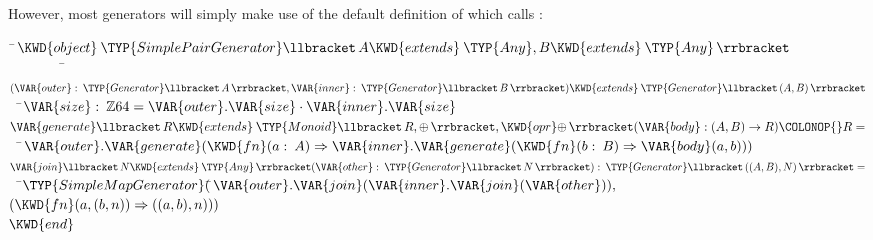However, most generators will simply make use of the default
definition of  which calls :
\begin{Fortress}
{\tt~}\pushtabs\=\+\( \KWD{object}\mskip 4mu plus 4mu\TYP{SimplePairGenerator}\llbracket\,A \KWD{extends}\mskip 4mu plus 4mu\TYP{Any}, B \KWD{extends}\mskip 4mu plus 4mu\TYP{Any}\,\rrbracket\)\\
{\tt~~~~~~~~}\pushtabs\=\+\(         (\VAR{outer} \mathrel{\mathtt{:}}\mskip 4mu plus 4mu\TYP{Generator}\llbracket\,A\,\rrbracket, \VAR{inner} \mathrel{\mathtt{:}}\mskip 4mu plus 4mu\TYP{Generator}\llbracket\,B\,\rrbracket) \KWD{extends}\mskip 4mu plus 4mu\TYP{Generator}\llbracket\,(A, B)\,\rrbracket\)\-\\\poptabs
{\tt~~}\pushtabs\=\+\(   \VAR{size} \mathrel{\mathtt{:}}\mskip 4mu plus 4mu\mathbb{Z}64 = \VAR{outer}.\VAR{size} \cdot \VAR{inner}.\VAR{size}\)\\
\(   \VAR{generate}\llbracket\,R \KWD{extends}\mskip 4mu plus 4mu\TYP{Monoid}\llbracket\,R, \oplus\,\rrbracket, \KWD{opr} \mathord{\oplus}\,\rrbracket(\VAR{body} \mathrel{\mathtt{:}} (A, B) \rightarrow R)\COLONOP{}R =\)\\
{\tt~~}\pushtabs\=\+\(     \VAR{outer}.\VAR{generate}(\KWD{fn} (a \mathrel{\mathtt{:}}\mskip 4mu plus 4mu{A}) \Rightarrow \VAR{inner}.\VAR{generate}(\KWD{fn} (b \mathrel{\mathtt{:}}\mskip 4mu plus 4mu{B}) \Rightarrow \VAR{body} (a,b)))\)\-\\\poptabs
\(   \VAR{join}\llbracket\,N \KWD{extends}\mskip 4mu plus 4mu\TYP{Any}\,\rrbracket(\VAR{other} \mathrel{\mathtt{:}}\mskip 4mu plus 4mu\TYP{Generator}\llbracket\,N\,\rrbracket) \mathrel{\mathtt{:}}\mskip 4mu plus 4mu\TYP{Generator}\llbracket\,((A,B), N)\,\rrbracket =\)\\
{\tt~~}\pushtabs\=\+\(     \TYP{SimpleMapGenerator}( \null\)\pushtabs\=\+\(\VAR{outer}.\VAR{join}(\VAR{inner}.\VAR{join}(\VAR{other})),\)\\
\(                        (\KWD{fn} (a,(b,n)) \Rightarrow ((a,b),n)))\)\-\-\-\\\poptabs\poptabs\poptabs
\( \KWD{end}\)\-\\\poptabs
\end{Fortress}
